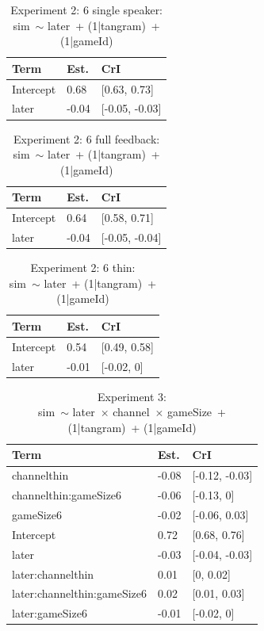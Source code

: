 \documentclass[
  english,
  a4paper,
]{article}
\begin{document}
\begin{table}[h!]

\caption{\label{tab:unnamed-chunk-19}Experiment 2: 6 single speaker:\\ sim~$\sim$ later~+ (1|tangram)~+ (1|gameId)}
\centering
\begin{tabular}[t]{lll}
\toprule
Term & Est. & CrI\\
\midrule
Intercept & 0.68 & {}[0.63, 0.73]\\
later & -0.04 & {}[-0.05, -0.03]\\
\bottomrule
\end{tabular}
\end{table}

\begin{table}[h!]

\caption{\label{tab:unnamed-chunk-19}Experiment 2: 6 full feedback:\\ sim~$\sim$ later~+ (1|tangram)~+ (1|gameId)}
\centering
\begin{tabular}[t]{lll}
\toprule
Term & Est. & CrI\\
\midrule
Intercept & 0.64 & {}[0.58, 0.71]\\
later & -0.04 & {}[-0.05, -0.04]\\
\bottomrule
\end{tabular}
\end{table}

\begin{table}[h!]

\caption{\label{tab:unnamed-chunk-19}Experiment 2: 6 thin:\\ sim~$\sim$ later~+ (1|tangram)~+ (1|gameId)}
\centering
\begin{tabular}[t]{lll}
\toprule
Term & Est. & CrI\\
\midrule
Intercept & 0.54 & {}[0.49, 0.58]\\
later & -0.01 & {}[-0.02, 0]\\
\bottomrule
\end{tabular}
\end{table}

\begin{table}[h!]

\caption{\label{tab:unnamed-chunk-19}Experiment 3:\\ sim~$\sim$ later~$\times$ channel~$\times$ gameSize~+ (1|tangram)~+ (1|gameId)}
\centering
\begin{tabular}[t]{lll}
\toprule
Term & Est. & CrI\\
\midrule
channelthin & -0.08 & {}[-0.12, -0.03]\\
channelthin:gameSize6 & -0.06 & {}[-0.13, 0]\\
gameSize6 & -0.02 & {}[-0.06, 0.03]\\
Intercept & 0.72 & {}[0.68, 0.76]\\
later & -0.03 & {}[-0.04, -0.03]\\
\addlinespace
later:channelthin & 0.01 & {}[0, 0.02]\\
later:channelthin:gameSize6 & 0.02 & {}[0.01, 0.03]\\
later:gameSize6 & -0.01 & {}[-0.02, 0]\\
\bottomrule
\end{tabular}
\end{table}
\end{document}
